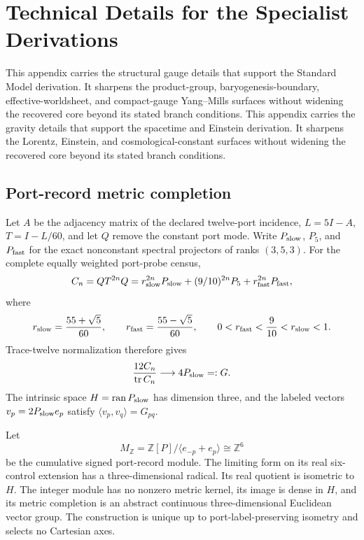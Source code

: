 \section{Technical Details for the Specialist Derivations}
\label{app:derivation-technical-port}

\ifdefined\OPHSkipEinsteinChain
This appendix carries the structural gauge details that support the Standard Model derivation.
It sharpens the product-group, baryogenesis-boundary, effective-worldsheet, and compact-gauge
Yang--Mills surfaces without widening the recovered core beyond its stated branch conditions.
\else
This appendix carries the gravity details that support the spacetime and Einstein derivation. It
sharpens the Lorentz, Einstein, and cosmological-constant surfaces without widening the recovered
core beyond its stated branch conditions.
\fi

\ifdefined\OPHSkipEinsteinChain
\else
\subsection{Port-record metric completion}

\begin{theorem}
Let \(A\) be the adjacency matrix of the declared twelve-port incidence,
\(L=5I-A\), \(T=I-L/60\), and let \(Q\) remove the constant port mode. Write
\(P_{\rm slow}\), \(P_5\), and \(P_{\rm fast}\) for the exact nonconstant
spectral projectors of ranks \((3,5,3)\). For the complete equally weighted
port-probe census,
\[
C_n=QT^{2n}Q
=r_{\rm slow}^{2n}P_{\rm slow}
 +(9/10)^{2n}P_5
 +r_{\rm fast}^{2n}P_{\rm fast},
\]
where
\[
r_{\rm slow}=\frac{55+\sqrt5}{60},\qquad
r_{\rm fast}=\frac{55-\sqrt5}{60},\qquad
0<r_{\rm fast}<\frac9{10}<r_{\rm slow}<1.
\]
Trace-twelve normalization therefore gives
\[
\frac{12C_n}{\operatorname{tr}C_n}
\longrightarrow 4P_{\rm slow}=:G.
\]
The intrinsic space \(H=\operatorname{ran}P_{\rm slow}\) has dimension three,
and the labeled vectors \(v_p=2P_{\rm slow}e_p\) satisfy
\(\langle v_p,v_q\rangle=G_{pq}\).

Let
\[
M_{\mathbb Z}=\mathbb Z[P]/\langle e_{-p}+e_p\rangle\cong\mathbb Z^6
\]
be the cumulative signed port-record module. The limiting form on its real
six-control extension has a three-dimensional radical. Its real quotient is
isometric to \(H\). The integer module has no nonzero metric kernel, its image
is dense in \(H\), and its metric completion is an abstract continuous
three-dimensional Euclidean vector group. The construction is unique up to
port-label-preserving isometry and selects no Cartesian axes.
\end{theorem}

